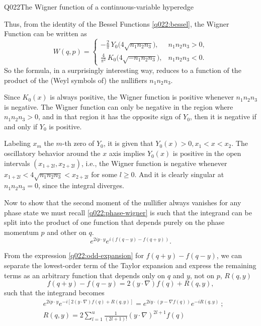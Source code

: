 \begin{entry}{Q022}{The Wigner function of a continuous-variable hyperedge}
\begin{solution}[Part (c)]
Thus, from the identity of the Bessel Functions \eqref{q022:bessel}, the Wigner Function can be written as
\begin{equation}
   W(q,p) =\begin{cases}
     -\frac{2}{\pi}\,Y_0\bigl(4\sqrt{n_1n_2n_3}\bigr), & n_1n_2n_3>0,\\[2pt]
     \frac{4}{\pi^2}\,K_0\bigl(4\sqrt{-n_1n_2n_3}\bigr), & n_1n_2n_3<0 .
   \end{cases}
   \label{q022:closed-form}
\end{equation}
So the formula, in a surprisingly interesting way, reduces to a function of the product of the (Weyl symbols of) the nullifiers $n_1n_2n_3$.

\end{solution}

\begin{solution}[Part (d)]

Since $K_0(x)$ is always positive, the Wigner function is positive whenever $n_1n_2n_3$ is negative. The Wigner function can only be negative in the region where $n_1n_2n_3>0$, and in that region it has the opposite sign of $Y_0$, then it is negative if and only if $Y_0$ is positive.

Labeling $x_m$ the $m$-th zero of $Y_0$, it is given that $Y_0(x)>0,  x_1<x<x_2$. The oscillatory behavior around the $x$ axis implies $Y_0(x)$ is positive in the open intervals $(x_{1+2l} , x_{2+2l})$, i.e., the Wigner function is negative whenever $x_{1+2l}<4\sqrt{n_1n_2n_3}<x_{2+2l}$ for some $l\geq 0$. And it is clearly singular at $n_1n_2n_3=0$, since the integral diverges.

Now to show that the second moment of the nullifier always vanishes for any phase state we must recall \eqref{q022:phase-wigner} is such that the integrand can be split into the product of one function that depends purely on the phase momentum $p$ and other on $q$.
\[
  e^{2ip\cdot y} e^{i(f(q-y)-f(q+y))}.
\]

From the expression \eqref{q022:odd-expansion} for $f(q+y)-f(q-y)$, we can separate the lowest-order term of the Taylor expansion and express the remaining terms as an arbitrary function that depends only on $ q$ and $ y$, not on $p$, $R(q,y)$
\[
  f(q+y)-f(q-y)= 2 (y\cdot\nabla)f(q) + R(q,y),
\]
such that the integrand becomes
\begin{equation}
\begin{split}
    &e^{2ip\cdot y} e^{-i[2 (y\cdot\nabla)f(q) + R(q,y)]}= e^{2iy\cdot(p-\nabla f(q))} e^{-iR(q,y)}\ ;\\
    &R(q,y)=  2\sum_{l=1}^{u} \frac{1}{(2l+1)!} \left(y\cdot\nabla \right)^{2l+1}f(q)
\end{split}
    \label{q022:remainder}
\end{equation}


\end{solution}
\end{entry}
